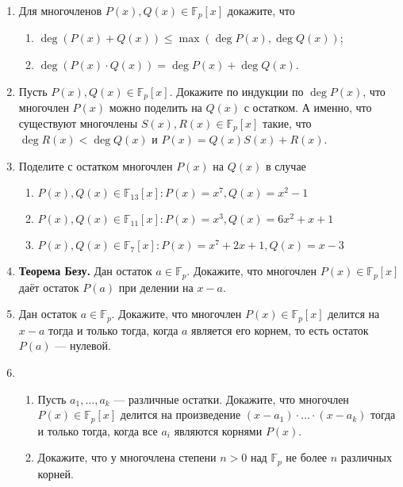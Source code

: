 \documentclass{article}
\begin{document}
\begin{enumerate}[label*=\protect\fbox{\arabic{enumi}}]


\item Для многочленов $P(x), Q(x) \in \mathbb{F}_p[x]$ докажите, что 
\begin{enumerate}
	\item  $\deg(P(x) + Q(x)) \leq \max(\deg P(x), \deg Q(x))$; 
	\item  $\deg(P(x) \cdot Q(x)) = \deg P(x) + \deg Q(x)$.
\end{enumerate}

\item Пусть $P(x), Q(x) \in \mathbb{F}_p [x]$. Докажите по индукции по $\deg P (x)$, что многочлен $P(x)$ можно поделить на $Q(x)$ с остатком. А именно, что существуют многочлены $S(x), R(x) \in \mathbb{F}_p[x]$ такие, что $\deg R(x) < \deg Q(x)$ и $P(x) = Q(x)S(x) + R(x)$.

\item Поделите с остатком многочлен $P(x)$ на $Q(x)$ в случае
\begin{enumerate}
	\item  $P(x),Q(x) \in \mathbb{F}_{13}[x]: P(x) = x^7, Q(x) = x^2 - 1$
	\item  $P(x),Q(x) \in \mathbb{F}_{11}[x]: P(x) = x^3, Q(x) = 6x^2 + x + 1$
	\item $P(x),Q(x) \in \mathbb{F}_{7}[x]: P(x) = x^7 + 2x + 1, Q(x) = x - 3$
\end{enumerate}

\item \textbf{Теорема Безу.} Дан остаток $a \in \mathbb{F}_p$. Докажите, что многочлен $P(x) \in \mathbb{F}_p[x]$ даёт остаток $P(a)$ при делении на $x - a$.

\item Дан остаток $a \in \mathbb{F}_p$. Докажите, что многочлен $P(x) \in \mathbb{F}_p[x]$ делится на $x - a$ тогда и только тогда, когда $a$ является его корнем, то есть остаток $P (a)$ — нулевой.

\item
\begin{enumerate}
	\item  Пусть $a_1, \ldots, a_k$ — различные остатки. Докажите, что многочлен $P (x) \in \mathbb{F}_p[x]$ делится на произведение $(x - a_1) \cdot \ldots \cdot (x - a_k)$ тогда и только тогда, когда все $a_i$ являются корнями $P(x)$.
	\item Докажите, что у многочлена степени $n > 0$ над $\mathbb{F}_p$ не более $n$ различных корней.
\end{enumerate} 


\end{enumerate}
\end{document}
